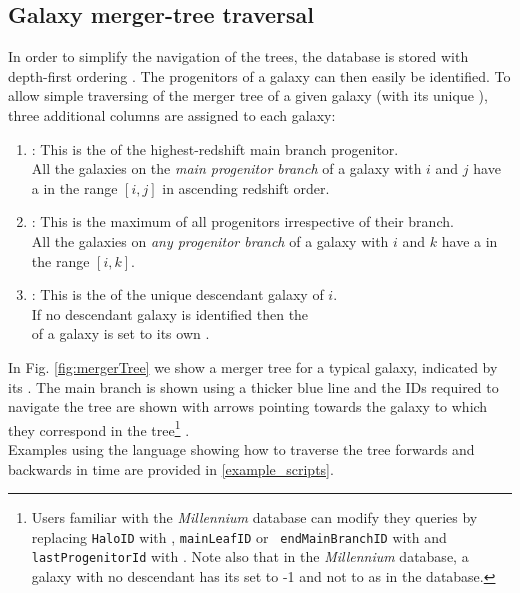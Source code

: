\subsection{Galaxy merger-tree traversal}
In order to simplify the navigation of the trees, the database is stored with
depth-first ordering \citep[see][Qu et al., \textit{in prep.}]{Lemson2006a}. The
progenitors of a galaxy can then easily be identified. To allow simple
traversing of the merger tree of a given galaxy (with its unique \HaloID), three
additional columns are assigned to each galaxy:
\begin{enumerate}
\item \TopLeafID: This is the \HaloID of the highest-redshift main branch
  progenitor. \\ 
  All the galaxies on the \emph{main progenitor branch} of a galaxy with \HaloID $i$
  and \TopLeafID $j$ have a \HaloID in the range $[i,j]$ in ascending redshift order.
\item \LastProgID: This is the maximum \HaloID of all progenitors irrespective
  of their branch. \\
  All the galaxies on \emph{any progenitor branch} of a galaxy with \HaloID $i$
  and \LastProgID $k$ have a \HaloID in the range $[i,k]$. 
\item \DescendantID: This is the \HaloID of the unique descendant galaxy of
  $i$. \\
  If no descendant galaxy is identified then the \\ \DescendantID of a galaxy is
  set to its own \HaloID.
\end{enumerate}
In Fig. \ref{fig:mergerTree} we show a merger tree for a typical galaxy,
indicated by its \HaloID. The main branch is shown using a thicker blue line
and the IDs required to navigate the tree are shown with arrows pointing
towards the galaxy to which they correspond in the tree\footnote{Users
  familiar with the \emph{Millennium} database can modify they queries
  by replacing {\tt HaloID} with \GalaxyID, {\tt mainLeafID} or {\tt
    endMainBranchID} with \TopLeafID and {\tt lastProgenitorId}
  with \LastProgID. Note also that in the \emph{Millennium} database, a
galaxy with no descendant has its \DescendantID set to -1 and not to
\GalaxyID as in the \eagle database.} . \\ Examples using the
\sql language showing how to traverse the tree forwards and backwards in time
are provided in \ref{example_scripts}.







